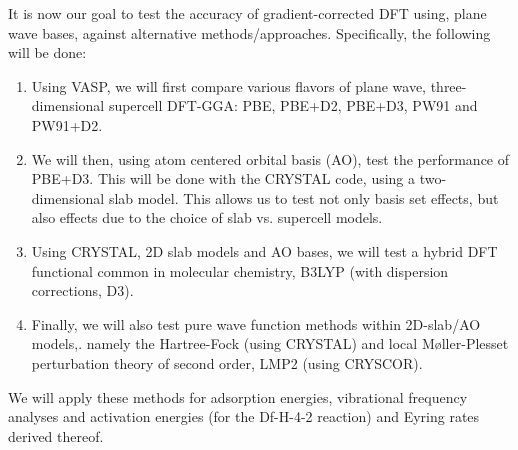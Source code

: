 \documentclass[11pt,DIV=13,BCOR=5mm,a4paper,headinclude]{scrbook}
\begin{document}
It is now our goal to test the accuracy of gradient-corrected DFT using, plane wave bases, against alternative methods/approaches.
Specifically, the following will be done:
\begin{enumerate}
\item Using VASP, we will first compare various flavors of plane wave, three-dimensional supercell DFT-GGA: PBE, PBE+D2, PBE+D3, PW91 and PW91+D2.
\item We will then, using atom centered orbital basis (AO), test the performance of PBE+D3.
This will be done with the CRYSTAL code, using a two-dimensional slab model.
This allows us to test not only basis set effects, but also effects due to the choice of slab vs. supercell models.
\item Using CRYSTAL, 2D slab models and AO bases, we will test a hybrid DFT functional common in molecular chemistry, B3LYP (with dispersion corrections, D3).
\item Finally, we will also test pure wave function methods within 2D-slab/AO models,. namely the Hartree-Fock (using CRYSTAL) and local M\o{}ller-Plesset perturbation theory of second order, LMP2 (using CRYSCOR).
\end{enumerate}
We will apply these methods for adsorption energies, vibrational frequency analyses and activation energies (for the Df-H-4-2 reaction) and Eyring rates derived thereof.

\end{document}
